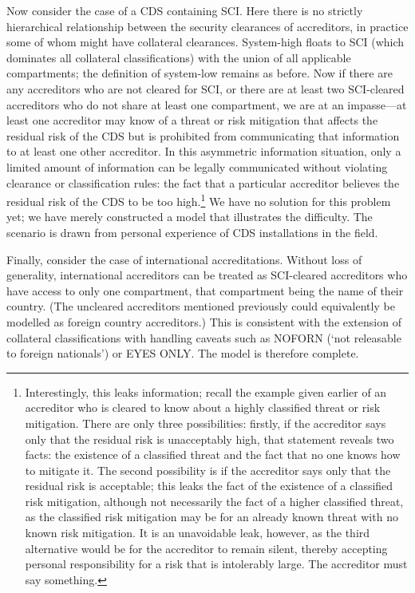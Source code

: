 \documentclass{llncs}
\begin{document}
Now consider the case of a CDS containing SCI.  Here there is no strictly hierarchical
relationship between the security clearances of accreditors, in practice some of whom
might have collateral clearances.  System-high floats to SCI (which dominates all
collateral classifications) with the union
of all applicable compartments; the definition of system-low remains as before.
Now if there are any accreditors who are not cleared for SCI, or there are at least two
SCI-cleared accreditors who do not share at least one compartment, we are at an
impasse---at least one accreditor may know of a threat or risk mitigation that
affects the residual risk of the CDS but is prohibited from communicating that
information to at least one other accreditor.  In this asymmetric information situation,
only a limited amount of information can be legally communicated without violating clearance
or classification rules: the fact that a particular accreditor believes the residual
risk of the CDS to be too high.\footnote{Interestingly, this leaks information; recall
the example given earlier of an accreditor who is cleared to know about a highly
classified threat or risk mitigation.  There are only three possibilities: firstly, if the
accreditor says only that the residual risk is unacceptably high, that statement
reveals two facts: the existence of a classified threat and the fact that no one
knows how to mitigate it.  The second possibility is if the accreditor says only that
the residual risk is acceptable; this leaks the fact of the existence of a classified
risk mitigation, although not necessarily the fact of a higher classified threat, as
the classified risk mitigation may be for an already known threat with no known risk mitigation.
It is an unavoidable leak, however, as the third alternative would be for the accreditor
to remain silent, thereby accepting personal responsibility for a risk
that is intolerably large.  The accreditor must say something.} We have no solution
for this problem yet; we have
merely constructed a model that illustrates the difficulty.  The scenario is
drawn from personal experience of CDS installations in the field.

Finally, consider the case of international accreditations.  Without loss of generality,
international accreditors can be treated as SCI-cleared accreditors who have access to
only one compartment, that compartment being the name of their country.  (The uncleared
accreditors mentioned previously could equivalently be modelled as foreign country
accreditors.)  This is consistent with the extension of collateral classifications with
handling caveats such as NOFORN (`not releasable to foreign nationals') or EYES ONLY.
The model is therefore complete.
\end{document}

